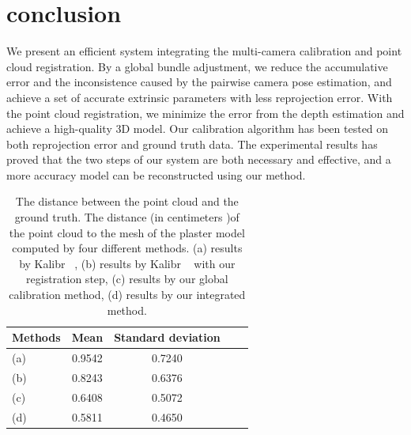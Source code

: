 \section{conclusion}
We present an efficient system integrating the multi-camera calibration and point cloud registration. By a global bundle adjustment, we reduce the accumulative error and the inconsistence caused by the pairwise camera pose estimation, and achieve a set of accurate extrinsic parameters with less reprojection error. With the point cloud registration, we minimize the error from the depth estimation and achieve a high-quality 3D model. Our calibration algorithm has been tested on both reprojection error and ground truth data. The experimental results has proved that the two steps of our system are both necessary and effective, and a more accuracy model can be reconstructed using our method.
\begin{table}
	\centering
	\caption{The distance between the point cloud and the ground truth. The distance (in centimeters )of the point cloud to the mesh of the plaster model computed by four different methods. (a) results by Kalibr ~\cite{Maye2013Self}, (b) results by Kalibr ~\cite{Maye2013Self} with our registration step, (c) results by our global calibration method, (d) results by our integrated method.}
	\label{tab:distance}
	\begin{tabular}{lcccc}
		\hline
		Methods & Mean &Standard deviation\\
		\hline
		(a) &0.9542 &0.7240\\

		(b) &0.8243 &0.6376\\
		
		(c) &0.6408 &0.5072\\
		
		(d) &0.5811 &0.4650\\
		\hline
		
	\end{tabular}
\label{fig:distance}
\end{table}

 
